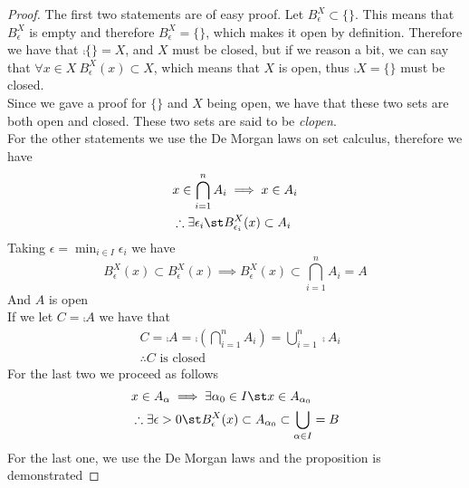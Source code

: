 \documentclass[../mmf.tex]{subfiles}
\begin{document}
\begin{proof}
	The first two statements are of easy proof. Let $B^X_\epsilon\subset\{\}$. This means that $B^X_\epsilon$ is empty and therefore $B^X_\epsilon=\{\}$, which makes it open by definition. Therefore we have that $\comp{\{\}}=X$, and $X$ must be closed, but if we reason a bit, we can say that $\forall x\in X\ B_\epsilon^X(x)\subset X$, which means that $X$ is open, thus $\comp{X}=\{\}$ must be closed.\\
	Since we gave a proof for $\{\}$ and $X$ being open, we have that these two sets are both open and closed. These two sets are said to be \textit{clopen}.\\
	For the other statements we use the De Morgan laws on set calculus, therefore we have
	\begin{equation*}
		\begin{aligned}
			&x\in\bigcap_{i=1}^nA_i\implies{} x\in A_i\\
			&\therefore\exists\epsilon_i\st B^X_{\epsilon_i}(x)\subset A_i\\
		\end{aligned}
	\end{equation*}
	Taking $\epsilon=\min_{i\in I}\epsilon_i$ we have
	\begin{equation*}
		B_\epsilon^X(x)\subset B_\epsilon^X(x)\implies{} B_\epsilon^X(x)\subset\bigcap_{i=1}^nA_i=A
	\end{equation*}
	And $A$ is open\\
	If we let $C=\comp{A}$ we have that\\
	\begin{equation*}
		\begin{aligned}
			&C=\comp{A}=\comp{\left( \bigcap_{i=1}^nA_i \right)}=\bigcup_{i=1}^n\comp{A}_i\\
			&\therefore{C}\text{ is closed}
		\end{aligned}
	\end{equation*}
	For the last two we proceed as follows
	\begin{equation*}
		\begin{aligned}
			&x\in A_\alpha\implies{}\exists\alpha_0\in I\st x\in A_{\alpha_0}\\
			&\therefore\exists\epsilon>0\st B_{\epsilon}^X(x)\subset A_{\alpha_0}\subset\bigcup_{\alpha\in I}=B
		\end{aligned}
	\end{equation*}
	For the last one, we use the De Morgan laws and the proposition is demonstrated
\end{proof}
\end{document}
